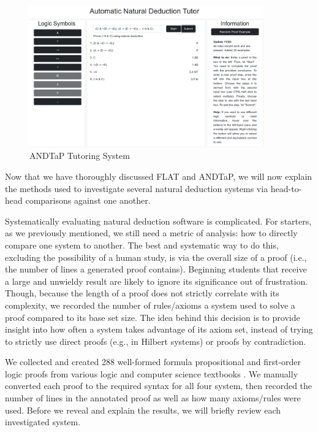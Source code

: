 \documentclass[ms]{uncgdissertationexp2}
\theoremstyle{plain}
\theoremstyle{definition}
\theoremstyle{remark}
\begin{document}
\begin{figure}[!ht]
	\centering
	\includegraphics[width=0.9\textwidth]{andtap-tutor.png}
	\caption{ANDTaP Tutoring System}
	\label{fig:andtap}
\end{figure} 

Now that we have thoroughly discussed FLAT and ANDTaP, we will now explain the methods used to investigate several natural deduction systems via head-to-head comparisons against one another.

Systematically evaluating natural deduction software is complicated. For starters, as we previously mentioned, we still need a metric of analysis: how to directly compare one system to another. The best and systematic way to do this, excluding the possibility of a human study, is via the overall size of a proof (i.e., the number of lines a generated proof contains). Beginning students that receive a large and unwieldy result are likely to ignore its significance out of frustration. Though, because the length of a proof does not strictly correlate with its complexity, we recorded the number of rules/axioms a system used to solve a proof compared to its base set size. The idea behind this decision is to provide insight into how often a system takes advantage of its axiom set, instead of trying to strictly use direct proofs (e.g., in Hilbert systems) or proofs by contradiction. 

We collected and created 288 well-formed formula propositional and first-order logic proofs from various logic and computer science textbooks \cite{heinbook} \cite{lol} \cite{methodsoflogic}. We manually converted each proof to the required syntax for all four system, then recorded the number of lines in the annotated proof as well as how many axioms/rules were used. Before we reveal and explain the results, we will briefly review each investigated system.
\end{document}

